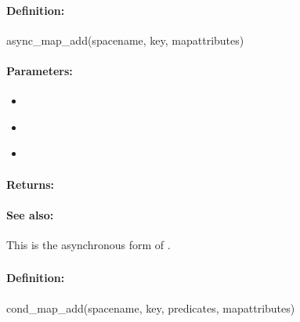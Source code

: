 \paragraph{Definition:}
\begin{rubycode}
async_map_add(spacename, key, mapattributes)
\end{rubycode}

\paragraph{Parameters:}
\begin{itemize}[noitemsep]
\item {}\\

\item {}\\

\item {}\\

\end{itemize}

\paragraph{Returns:}


\paragraph{See also:}  This is the asynchronous form of .

\pagebreak
\subsubsection{}
\label{api:ruby:cond_map_add}


\paragraph{Definition:}
\begin{rubycode}
cond_map_add(spacename, key, predicates, mapattributes)
\end{rubycode}

